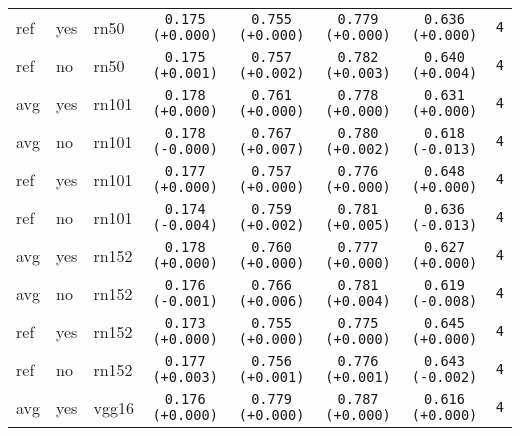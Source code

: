 \begin{tabular}{|l|l|l|c|c|c|c|c|}
\hline
\rowcolor{verylightgray}ref & yes & rn50 & \texttt{0.175 {\color{black}(+0.000)}} & \texttt{0.755 {\color{black}(+0.000)}} & \texttt{0.779 {\color{black}(+0.000)}} & \texttt{0.636 {\color{black}(+0.000)}} & \texttt{4} \\
ref & no & rn50 & \texttt{0.175 {\color{green}(+0.001)}} & \texttt{0.757 {\color{red}(+0.002)}} & \texttt{0.782 {\color{red}(+0.003)}} & \texttt{0.640 {\color{green}(+0.004)}} & \texttt{4} \\
\hline
\rowcolor{verylightgray}avg & yes & rn101 & \texttt{0.178 {\color{black}(+0.000)}} & \texttt{0.761 {\color{black}(+0.000)}} & \texttt{0.778 {\color{black}(+0.000)}} & \texttt{0.631 {\color{black}(+0.000)}} & \texttt{4} \\
avg & no & rn101 & \texttt{0.178 {\color{black}(-0.000)}} & \texttt{0.767 {\color{red}(+0.007)}} & \texttt{0.780 {\color{red}(+0.002)}} & \texttt{0.618 {\color{red}(-0.013)}} & \texttt{4} \\
\hline
\rowcolor{verylightgray}ref & yes & rn101 & \texttt{0.177 {\color{black}(+0.000)}} & \texttt{0.757 {\color{black}(+0.000)}} & \texttt{0.776 {\color{black}(+0.000)}} & \texttt{0.648 {\color{black}(+0.000)}} & \texttt{4} \\
ref & no & rn101 & \texttt{0.174 {\color{red}(-0.004)}} & \texttt{0.759 {\color{red}(+0.002)}} & \texttt{0.781 {\color{red}(+0.005)}} & \texttt{0.636 {\color{red}(-0.013)}} & \texttt{4} \\
\hline
\rowcolor{verylightgray}avg & yes & rn152 & \texttt{0.178 {\color{black}(+0.000)}} & \texttt{0.760 {\color{black}(+0.000)}} & \texttt{0.777 {\color{black}(+0.000)}} & \texttt{0.627 {\color{black}(+0.000)}} & \texttt{4} \\
avg & no & rn152 & \texttt{0.176 {\color{red}(-0.001)}} & \texttt{0.766 {\color{red}(+0.006)}} & \texttt{0.781 {\color{red}(+0.004)}} & \texttt{0.619 {\color{red}(-0.008)}} & \texttt{4} \\
\hline
\rowcolor{verylightgray}ref & yes & rn152 & \texttt{0.173 {\color{black}(+0.000)}} & \texttt{0.755 {\color{black}(+0.000)}} & \texttt{0.775 {\color{black}(+0.000)}} & \texttt{0.645 {\color{black}(+0.000)}} & \texttt{4} \\
ref & no & rn152 & \texttt{0.177 {\color{green}(+0.003)}} & \texttt{0.756 {\color{red}(+0.001)}} & \texttt{0.776 {\color{red}(+0.001)}} & \texttt{0.643 {\color{red}(-0.002)}} & \texttt{4} \\
\hline
\rowcolor{verylightgray}avg & yes & vgg16 & \texttt{0.176 {\color{black}(+0.000)}} & \texttt{0.779 {\color{black}(+0.000)}} & \texttt{0.787 {\color{black}(+0.000)}} & \texttt{0.616 {\color{black}(+0.000)}} & \texttt{4} \\

\end{tabular}
